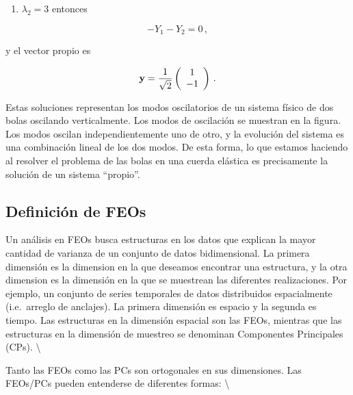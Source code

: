 \documentclass[
]{agujournal2019}
\providecommand{\tightlist}{%
  \setlength{\itemsep}{0pt}\setlength{\parskip}{0pt}}\usepackage{longtable,booktabs,array}
\begin{document}
\begin{enumerate}
\def\labelenumi{(\arabic{enumi})}
\setcounter{enumi}{1}
\tightlist
\item
  \(\lambda_2=3\) entonces
\end{enumerate}

\[-Y_1-Y_2=0\,,\]

y el vector propio es

\[{\textbf y}=\frac{1}{\sqrt{2}}\left(\begin{array}{c}
   1 \\
   -1 \\
        \end{array}\right)\,.\]

Estas soluciones representan los modos oscilatorios de un sistema físico
de dos bolas oscilando verticalmente. Los modos de oscilación se
muestran en la figura. Los modos oscilan independientemente uno de otro,
y la evolución del sistema es una combinación lineal de los dos modos.
De esta forma, lo que estamos haciendo al resolver el problema de las
bolas en una cuerda elástica es precisamente la solución de un sistema
``propio''.

\vspace{0.5cm}
\begin{center}
\end{center}

\vspace{0.25cm}

\subsection{Definición de FEOs}\label{definiciuxf3n-de-feos}

Un análisis en FEOs busca estructuras en los datos que explican la mayor
cantidad de varianza de un conjunto de datos bidimensional. La primera
dimensión es la dimension en la que deseamos encontrar una estructura, y
la otra dimension es la dimensión en la que se muestrean las diferentes
realizaciones. Por ejemplo, un conjunto de series temporales de datos
distribuidos espacialmente (i.e.~arreglo de anclajes). La primera
dimensión es espacio y la segunda es tiempo. Las estructuras en la
dimensión espacial son las FEOs, mientras que las estructuras en la
dimensión de muestreo se denominan Componentes Principales (CPs).
\textbackslash{}

Tanto las FEOs como las PCs son ortogonales en sus dimensiones. Las
FEOs/PCs pueden entenderse de diferentes formas: \textbackslash{}
\end{document}
